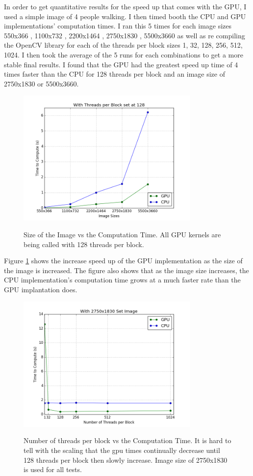 \documentclass[journal]{IEEEtran}
\begin{document}
In order to get quantitative results for the speed up that comes with the GPU, I used a simple image of 4 people walking. I then timed booth the CPU and GPU implementations’ computation times. I ran this 5 times for each image sizes 550x366 , 1100x732 , 2200x1464 , 2750x1830 , 5500x3660  as well as re compiling the OpenCV library for each of the threads per block sizes  1, 32, 128, 256, 512, 1024. I then took the average of the 5 runs for each combinations to get a more stable final results. I found that the GPU had the greatest speed up time of 4 times faster than the CPU for 128 threads per block and an image size of 2750x1830 or  5500x3660. \\

\begin{figure}[h]
\caption{Size of the Image vs the Computation Time. All GPU kernels are being called with 128 threads per block.}
\includegraphics[width=9cm]{SizeTime}
\label{fig:SizeTime}
\end{figure}



Figure \ref{fig:SizeTime} shows the increase speed up of the GPU implementation as the size of the image is increased. The figure also shows that as the image size increases, the CPU implementation’s computation time grows at a much faster rate than the GPU implantation does. \\

\begin{figure}[h]
\caption{Number of threads per block vs the Computation Time. It is hard to tell with the scaling that the gpu times continually decrease until 128 threads per block then slowly increase. Image size of 2750x1830 is used for all tests.}
\includegraphics[width=9cm]{ThreadTime}
\label{fig:ThreadTime}
\end{figure}
\end{document}
